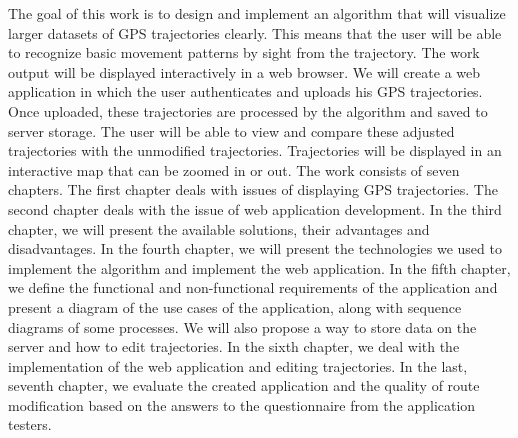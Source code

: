 The goal of this work is to design and implement an algorithm that will visualize larger datasets of GPS trajectories clearly. This means that the user will be able to recognize basic movement patterns by sight from the trajectory. The work output will be displayed interactively in a web browser. We will create a web application in which the user authenticates and uploads his GPS trajectories. Once uploaded, these trajectories are processed by the algorithm and saved to server storage. The user will be able to view and compare these adjusted trajectories with the unmodified trajectories. Trajectories will be displayed in an interactive map that can be zoomed in or out. The work consists of seven chapters. The first chapter deals with issues of displaying GPS trajectories. The second chapter deals with the issue of web application development. In the third chapter, we will present the available solutions, their advantages and disadvantages. In the fourth chapter, we will present the technologies we used to implement the algorithm and implement the web application. In the fifth chapter, we define the functional and non-functional requirements of the application and present a diagram of the use cases of the application, along with sequence diagrams of some processes. We will also propose a way to store data on the server and how to edit trajectories. In the sixth chapter, we deal with the implementation of the web application and editing trajectories. In the last, seventh chapter, we evaluate the created application and the quality of route modification based on the answers to the questionnaire from the application testers.